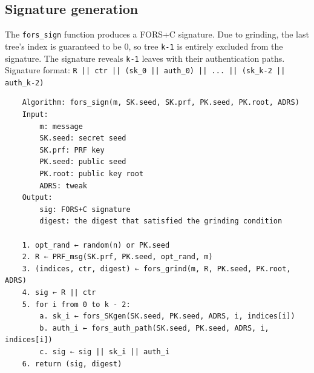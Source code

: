 \subsection{Signature generation}
The \texttt{fors\_sign} function produces a FORS+C signature. Due to grinding, the last tree's index is guaranteed to be 0, so tree \texttt{k-1} is entirely excluded from the signature. The signature reveals \texttt{k-1} leaves with their authentication paths. Signature format: \texttt{R || ctr || (sk\_0 || auth\_0) || ... || (sk\_{k-2} || auth\_{k-2})}
\begin{verbatim}
    Algorithm: fors_sign(m, SK.seed, SK.prf, PK.seed, PK.root, ADRS)
    Input:
        m: message
        SK.seed: secret seed
        SK.prf: PRF key
        PK.seed: public seed
        PK.root: public key root
        ADRS: tweak
    Output:
        sig: FORS+C signature
        digest: the digest that satisfied the grinding condition

    1. opt_rand ← random(n) or PK.seed
    2. R ← PRF_msg(SK.prf, PK.seed, opt_rand, m)
    3. (indices, ctr, digest) ← fors_grind(m, R, PK.seed, PK.root, ADRS)
    4. sig ← R || ctr
    5. for i from 0 to k - 2:
        a. sk_i ← fors_SKgen(SK.seed, PK.seed, ADRS, i, indices[i])
        b. auth_i ← fors_auth_path(SK.seed, PK.seed, ADRS, i, indices[i])
        c. sig ← sig || sk_i || auth_i
    6. return (sig, digest)
\end{verbatim}

